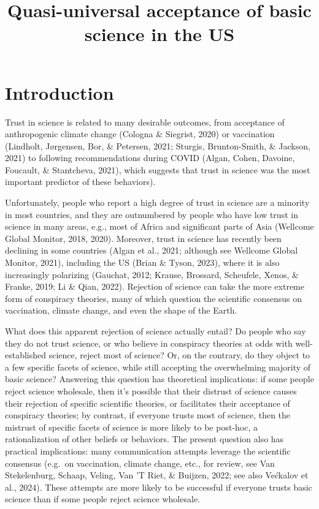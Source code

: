 \documentclass[
  doc,floatsintext]{apa6}
\title{Quasi-universal acceptance of basic science in the US}
\author{\textsuperscript{}}
\date{}
\affiliation{\vspace{0.5cm}\textsuperscript{} }
\begin{document}
\maketitle

\section{Introduction}\label{introduction}

Trust in science is related to many desirable outcomes, from acceptance of anthropogenic climate change (Cologna \& Siegrist, 2020) or vaccination (Lindholt, Jørgensen, Bor, \& Petersen, 2021; Sturgis, Brunton-Smith, \& Jackson, 2021) to following recommendations during COVID (Algan, Cohen, Davoine, Foucault, \& Stantcheva, 2021), which suggests that trust in science was the most important predictor of these behaviors).

Unfortunately, people who report a high degree of trust in science are a minority in most countries, and they are outnumbered by people who have low trust in science in many areas, e.g., most of Africa and significant parts of Asia (Wellcome Global Monitor, 2018, 2020). Moreover, trust in science has recently been declining in some countries (Algan et al., 2021; although see Wellcome Global Monitor, 2021), including the US (Brian \& Tyson, 2023), where it is also increasingly polarizing (Gauchat, 2012; Krause, Brossard, Scheufele, Xenos, \& Franke, 2019; Li \& Qian, 2022). Rejection of science can take the more extreme form of conspiracy theories, many of which question the scientific consensus on vaccination, climate change, and even the shape of the Earth.

What does this apparent rejection of science actually entail? Do people who say they do not trust science, or who believe in conspiracy theories at odds with well-established science, reject most of science? Or, on the contrary, do they object to a few specific facets of science, while still accepting the overwhelming majority of basic science? Answering this question has theoretical implications: if some people reject science wholesale, then it's possible that their distrust of science causes their rejection of specific scientific theories, or facilitates their acceptance of conspiracy theories; by contrast, if everyone trusts most of science, then the mistrust of specific facets of science is more likely to be post-hoc, a rationalization of other beliefs or behaviors. The present question also has practical implications: many communication attempts leverage the scientific consensus (e.g.~on vaccination, climate change, etc., for review, see Van Stekelenburg, Schaap, Veling, Van 'T Riet, \& Buijzen, 2022; see also Većkalov et al., 2024). These attempts are more likely to be successful if everyone trusts basic science than if some people reject science wholesale.
\end{document}
